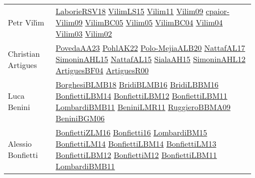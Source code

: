 {\begin{longtable}{p{4cm}p{20cm}}
Petr Vil{\'{\i}}m & \href{articles/LaborieRSV18.pdf}{LaborieRSV18}\cite{LaborieRSV18} \href{papers/VilimLS15.pdf}{VilimLS15}\cite{VilimLS15} \href{papers/Vilim11.pdf}{Vilim11}\cite{Vilim11} \href{papers/Vilim09.pdf}{Vilim09}\cite{Vilim09} \href{papers/cpaior-Vilim09.pdf}{cpaior-Vilim09}\cite{cpaior-Vilim09} \href{articles/VilimBC05.pdf}{VilimBC05}\cite{VilimBC05} \href{papers/Vilim05.pdf}{Vilim05}\cite{Vilim05} \href{papers/VilimBC04.pdf}{VilimBC04}\cite{VilimBC04} \href{papers/Vilim04.pdf}{Vilim04}\cite{Vilim04} \href{papers/Vilim03.pdf}{Vilim03}\cite{Vilim03} \href{papers/Vilim02.pdf}{Vilim02}\cite{Vilim02} \\
Christian Artigues & \href{papers/PovedaAA23.pdf}{PovedaAA23}\cite{PovedaAA23} \href{articles/PohlAK22.pdf}{PohlAK22}\cite{PohlAK22} \href{}{Polo-MejiaALB20}\cite{Polo-MejiaALB20} \href{articles/NattafAL17.pdf}{NattafAL17}\cite{NattafAL17} \href{articles/SimoninAHL15.pdf}{SimoninAHL15}\cite{SimoninAHL15} \href{articles/NattafAL15.pdf}{NattafAL15}\cite{NattafAL15} \href{papers/SialaAH15.pdf}{SialaAH15}\cite{SialaAH15} \href{papers/SimoninAHL12.pdf}{SimoninAHL12}\cite{SimoninAHL12} \href{papers/ArtiguesBF04.pdf}{ArtiguesBF04}\cite{ArtiguesBF04} \href{articles/ArtiguesR00.pdf}{ArtiguesR00}\cite{ArtiguesR00} \\
Luca Benini & \href{articles/BorghesiBLMB18.pdf}{BorghesiBLMB18}\cite{BorghesiBLMB18} \href{articles/BridiBLMB16.pdf}{BridiBLMB16}\cite{BridiBLMB16} \href{papers/BridiLBBM16.pdf}{BridiLBBM16}\cite{BridiLBBM16} \href{articles/BonfiettiLBM14.pdf}{BonfiettiLBM14}\cite{BonfiettiLBM14} \href{papers/BonfiettiLBM12.pdf}{BonfiettiLBM12}\cite{BonfiettiLBM12} \href{papers/BonfiettiLBM11.pdf}{BonfiettiLBM11}\cite{BonfiettiLBM11} \href{papers/LombardiBMB11.pdf}{LombardiBMB11}\cite{LombardiBMB11} \href{articles/BeniniLMR11.pdf}{BeniniLMR11}\cite{BeniniLMR11} \href{articles/RuggieroBBMA09.pdf}{RuggieroBBMA09}\cite{RuggieroBBMA09} \href{papers/BeniniBGM06.pdf}{BeniniBGM06}\cite{BeniniBGM06} \\
Alessio Bonfietti & \href{papers/BonfiettiZLM16.pdf}{BonfiettiZLM16}\cite{BonfiettiZLM16} \href{}{Bonfietti16}\cite{Bonfietti16} \href{papers/LombardiBM15.pdf}{LombardiBM15}\cite{LombardiBM15} \href{papers/BonfiettiLM14.pdf}{BonfiettiLM14}\cite{BonfiettiLM14} \href{articles/BonfiettiLBM14.pdf}{BonfiettiLBM14}\cite{BonfiettiLBM14} \href{papers/BonfiettiLM13.pdf}{BonfiettiLM13}\cite{BonfiettiLM13} \href{papers/BonfiettiLBM12.pdf}{BonfiettiLBM12}\cite{BonfiettiLBM12} \href{papers/BonfiettiM12.pdf}{BonfiettiM12}\cite{BonfiettiM12} \href{papers/BonfiettiLBM11.pdf}{BonfiettiLBM11}\cite{BonfiettiLBM11} \href{papers/LombardiBMB11.pdf}{LombardiBMB11}\cite{LombardiBMB11} \\

\end{longtable}}
